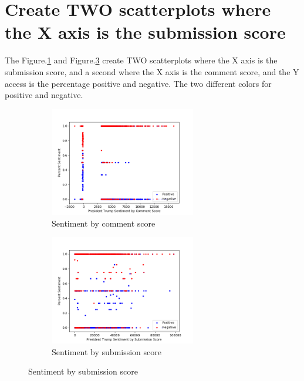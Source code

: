 \documentclass[12pt]{article}
\begin{document}
\section{Create TWO scatterplots where the X axis is the submission score}
The Figure.\ref{fig:5} and Figure.\ref{fig:6} create TWO scatterplots where the X axis is the submission score, and a second where the X axis is the comment score, and the Y access is the percentage positive and negative. The two different colors for positive and negative.
\begin{figure}[!h]
      \centering
    \begin{subfigure}
        \centering
        \includegraphics[width=0.7\textwidth]{../plots/part5_com.png}
        \caption{Sentiment by comment score}
        \label{fig:5}
    \end{subfigure}%
    \vspace{1em}
    \begin{subfigure}
       \centering
        \includegraphics[width=0.7\textwidth]{../plots/part5_sub.png}
        \caption{Sentiment by submission score}
        \label{fig:6}
    \end{subfigure}
\end{figure}
\end{document}

